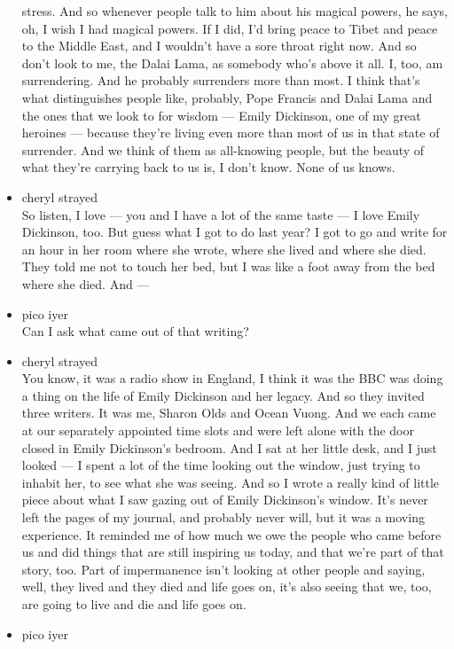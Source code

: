 \begin{itemize}
  stress. And so whenever people talk to him about his magical powers,
  he says, oh, I wish I had magical powers. If I did, I'd bring peace to
  Tibet and peace to the Middle East, and I wouldn't have a sore throat
  right now. And so don't look to me, the Dalai Lama, as somebody who's
  above it all. I, too, am surrendering. And he probably surrenders more
  than most. I think that's what distinguishes people like, probably,
  Pope Francis and Dalai Lama and the ones that we look to for wisdom
  --- Emily Dickinson, one of my great heroines --- because they're
  living even more than most of us in that state of surrender. And we
  think of them as all-knowing people, but the beauty of what they're
  carrying back to us is, I don't know. None of us knows.
\item
  cheryl strayed\\
  So listen, I love --- you and I have a lot of the same taste --- I
  love Emily Dickinson, too. But guess what I got to do last year? I got
  to go and write for an hour in her room where she wrote, where she
  lived and where she died. They told me not to touch her bed, but I was
  like a foot away from the bed where she died. And ---
\item
  pico iyer\\
  Can I ask what came out of that writing?
\item
  cheryl strayed\\
  You know, it was a radio show in England, I think it was the BBC was
  doing a thing on the life of Emily Dickinson and her legacy. And so
  they invited three writers. It was me, Sharon Olds and Ocean Vuong.
  And we each came at our separately appointed time slots and were left
  alone with the door closed in Emily Dickinson's bedroom. And I sat at
  her little desk, and I just looked --- I spent a lot of the time
  looking out the window, just trying to inhabit her, to see what she
  was seeing. And so I wrote a really kind of little piece about what I
  saw gazing out of Emily Dickinson's window. It's never left the pages
  of my journal, and probably never will, but it was a moving
  experience. It reminded me of how much we owe the people who came
  before us and did things that are still inspiring us today, and that
  we're part of that story, too. Part of impermanence isn't looking at
  other people and saying, well, they lived and they died and life goes
  on, it's also seeing that we, too, are going to live and die and life
  goes on.
\item
  pico iyer\\

\end{itemize}
